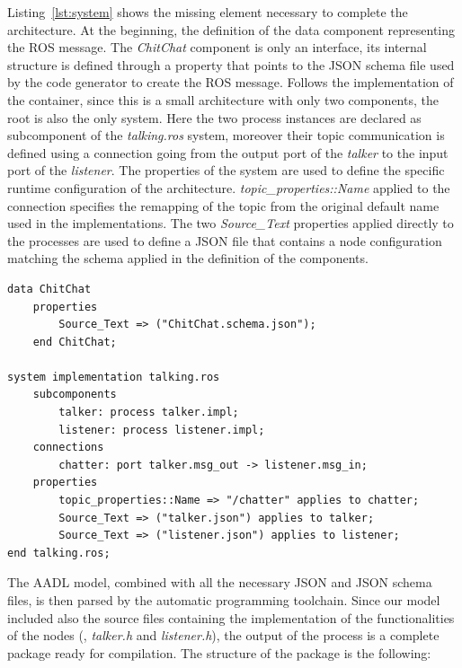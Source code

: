 Listing~\ref{lst:system} shows the missing element necessary to complete the architecture. At the beginning, the definition of the data component representing the ROS message. The \textit{ChitChat} component is only an interface, its internal structure is defined through a property that points to the JSON schema file used by the code generator to create the ROS message. Follows the implementation of the container, since this is a small architecture with only two components, the root is also the only system. Here the two process instances are declared as subcomponent of the \textit{talking.ros} system, moreover their topic communication is defined using a connection going from the output port of the \textit{talker} to the input port of the \textit{listener}. The properties of the system are used to define the specific runtime configuration of the architecture. \textit{topic\_properties::Name} applied to the connection specifies the remapping of the topic from the original default name used in the implementations. The two \textit{Source\_Text} properties applied directly to the processes are used to define a JSON file that contains a node configuration matching the schema applied in the definition of the components. 

\begin{lstlisting}[language=AADL,caption={Message and system definition.},label=lst:system]
data ChitChat
	properties
		Source_Text => ("ChitChat.schema.json");
	end ChitChat;
	
system implementation talking.ros
	subcomponents
		talker: process talker.impl;
		listener: process listener.impl;
	connections
		chatter: port talker.msg_out -> listener.msg_in;
	properties
		topic_properties::Name => "/chatter" applies to chatter;
		Source_Text => ("talker.json") applies to talker;
		Source_Text => ("listener.json") applies to listener;
end talking.ros;
\end{lstlisting}

The AADL model, combined with all the necessary JSON and JSON schema files, is then parsed by the automatic programming toolchain. Since our model included also the source files containing the implementation of the functionalities of the nodes (\ie, \textit{talker.h} and \textit{listener.h}), the output of the process is a complete package ready for compilation. The structure of the package is the following:

